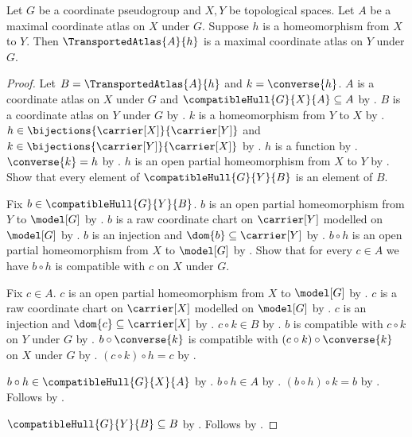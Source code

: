 \begin{classification}\label{transported_maximal_atlas_is_maximal}
    Let $G$ be a coordinate pseudogroup and $X,Y$ be topological spaces.
    Let $A$ be a maximal coordinate atlas on $X$ under $G$.
    Suppose $h$ is a homeomorphism from $X$ to $Y$.
    Then $\TransportedAtlas{A}{h}$ is a maximal coordinate atlas on $Y$ under $G$.
\end{classification}
\begin{proof}
    Let $B=\TransportedAtlas{A}{h}$ and $k=\converse{h}$.
    $A$ is a coordinate atlas on $X$ under $G$ and $\compatibleHull{G}{X}{A}\subseteq A$ by
        .
    $B$ is a coordinate atlas on $Y$ under $G$ by .
    $k$ is a homeomorphism from $Y$ to $X$ by .
    $h\in\bijections{\carrier[X]}{\carrier[Y]}$ and
        $k\in\bijections{\carrier[Y]}{\carrier[X]}$ by .
    $h$ is a function by .
    $\converse{k}=h$ by .
    $h$ is an open partial homeomorphism from $X$ to $Y$ by
        .
    Show that every element of $\compatibleHull{G}{Y}{B}$ is an element of $B$.
    \begin{subproof}
        Fix $b\in\compatibleHull{G}{Y}{B}$.
        $b$ is an open partial homeomorphism from $Y$ to $\model[G]$ by
            .
        $b$ is a raw coordinate chart on $\carrier[Y]$ modelled on $\model[G]$ by
            .
        $b$ is an injection and $\dom{b}\subseteq\carrier[Y]$ by .
        $b\circ h$ is an open partial homeomorphism from $X$ to $\model[G]$ by
            .
        Show that for every $c\in A$ we have $b\circ h$ is compatible with $c$ on $X$ under $G$.
        \begin{subproof}
            Fix $c\in A$.
            $c$ is an open partial homeomorphism from $X$ to $\model[G]$ by .
            $c$ is a raw coordinate chart on $\carrier[X]$ modelled on $\model[G]$ by
                .
            $c$ is an injection and $\dom{c}\subseteq\carrier[X]$ by .
            $c\circ k\in B$ by .
            $b$ is compatible with $c\circ k$ on $Y$ under $G$ by .
            $b\circ\converse{k}$ is compatible with $(c\circ k)\circ\converse{k}$
                on $X$ under $G$ by .
            $(c\circ k)\circ h=c$ by .
        \end{subproof}
        $b\circ h\in\compatibleHull{G}{X}{A}$ by .
        $b\circ h\in A$ by .
        $(b\circ h)\circ k=b$ by .
        Follows by .
    \end{subproof}
    $\compatibleHull{G}{Y}{B}\subseteq B$ by .
    Follows by .
\end{proof}

